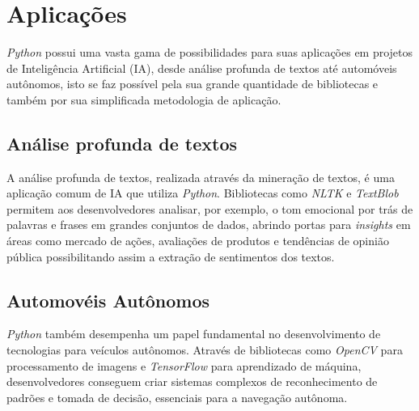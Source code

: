 \section{Aplicações}

\textit{Python} possui uma vasta gama de possibilidades para suas aplicações em projetos de Inteligência Artificial (IA), desde análise profunda de textos até automóveis autônomos, isto se faz possível pela sua grande quantidade de bibliotecas e também por sua simplificada metodologia de aplicação.\cite{didatica2024}

\subsection{Análise profunda de textos}

A análise profunda de textos, realizada através da mineração de textos, é uma aplicação comum de IA que utiliza \textit{Python}. Bibliotecas como \textit{NLTK} e \textit{TextBlob} permitem aos desenvolvedores analisar, por exemplo, o tom emocional por trás de palavras e frases em grandes conjuntos de dados, abrindo portas para \textit{insights} em áreas como mercado de ações, avaliações de produtos e tendências de opinião pública possibilitando assim a extração de sentimentos dos textos.\cite{didatica2024}

\subsection{Automovéis Autônomos}

\textit{Python} também desempenha um papel fundamental no desenvolvimento de tecnologias para veículos autônomos. Através de bibliotecas como \textit{OpenCV} para processamento de imagens e \textit{TensorFlow} para aprendizado de máquina, desenvolvedores conseguem criar sistemas complexos de reconhecimento de padrões e tomada de decisão, essenciais para a navegação autônoma.\cite{didatica2024}